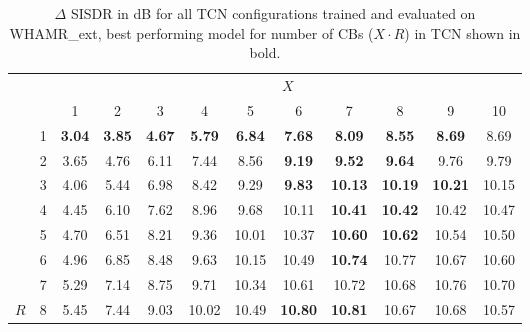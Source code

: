 \documentclass[conference,a4paper]{IEEEtran}
\begin{document}
\begin{table}[!ht]
\setlength\tabcolsep{2.5pt}
\caption{ $\Delta$ \ac{SISDR} 
{in dB}
for all TCN configurations trained and evaluated on WHAMR\_ext, best performing model for number of \acp{CB} ($X\cdot R$) in \ac{TCN} shown in bold.}
\centering
\begin{tabular}{cc|cccccccccc|} 
\cline{3-12}
&  & \multicolumn{10}{c|}{\cellcolor[HTML]{C0C0C0}$X$}\\ 
\cline{3-12} 
 &  & 
 \cellcolor[HTML]{C0C0C0}1 & \cellcolor[HTML]{C0C0C0}2 & \cellcolor[HTML]{C0C0C0}3 & \cellcolor[HTML]{C0C0C0}4 & \cellcolor[HTML]{C0C0C0}5 & \cellcolor[HTML]{C0C0C0}6 & \cellcolor[HTML]{C0C0C0}7 & \cellcolor[HTML]{C0C0C0}8 & \cellcolor[HTML]{C0C0C0}9 & \cellcolor[HTML]{C0C0C0}10 \\ 
 \hline
\multicolumn{1}{|c}{\cellcolor[HTML]{C0C0C0}}& \multicolumn{1}{|c|}{\cellcolor[HTML]{C0C0C0}1} & \bfseries 3.04 & \bfseries 3.85 & \bfseries 4.67 & \bfseries 5.79  & \bfseries 6.84  & \bfseries 7.68  & \bfseries 8.09  & \bfseries 8.55  & \bfseries 8.69  & 8.69  \\
\multicolumn{1}{|c}{\cellcolor[HTML]{C0C0C0}}& \multicolumn{1}{|c|}{\cellcolor[HTML]{C0C0C0}2} & 3.65 & 4.76 & 6.11 & 7.44  & 8.56  & \bfseries 9.19  & \bfseries 9.52  & \bfseries 9.64  & 9.76  & 9.79  \\
\multicolumn{1}{|c}{\cellcolor[HTML]{C0C0C0}}& \multicolumn{1}{|c|}{\cellcolor[HTML]{C0C0C0}3} & 4.06 & 5.44 & 6.98 & 8.42  & 9.29  & \bfseries 9.83  & \bfseries 10.13 & \bfseries 10.19 & \bfseries 10.21 & 10.15 \\
\multicolumn{1}{|c}{\cellcolor[HTML]{C0C0C0}}& \multicolumn{1}{|c|}{\cellcolor[HTML]{C0C0C0}4} & 4.45 & 6.10  & 7.62 & 8.96  & 9.68  & 10.11 & \bfseries 10.41 & \bfseries 10.42 & 10.42 & 10.47 \\
\multicolumn{1}{|c}{\cellcolor[HTML]{C0C0C0}}& \multicolumn{1}{|c|}{\cellcolor[HTML]{C0C0C0}5} & 4.70  & 6.51 & 8.21 & 9.36  & 10.01 & 10.37 & \bfseries 10.60  & \bfseries 10.62 & 10.54 & 10.50  \\
\multicolumn{1}{|c}{\cellcolor[HTML]{C0C0C0}}& \multicolumn{1}{|c|}{\cellcolor[HTML]{C0C0C0}6} & 4.96 & 6.85 & 8.48 & 9.63  & 10.15 & 10.49 & \bfseries 10.74 & 10.77 & 10.67 & 10.60  \\
\multicolumn{1}{|c}{\cellcolor[HTML]{C0C0C0}}& \multicolumn{1}{|c|}{\cellcolor[HTML]{C0C0C0}7} & 5.29 & 7.14 & 8.75 & 9.71  & 10.34 & 10.61 & 10.72 & 10.68 & 10.76 & 10.70  \\
\multicolumn{1}{|c}{\multirow{-8}{*}{\cellcolor[HTML]{C0C0C0}$R$}} & \multicolumn{1}{|c|}{\cellcolor[HTML]{C0C0C0}8} & 5.45 & 7.44 & 9.03 & 10.02 & 10.49 & \bfseries 10.80  & \bfseries 10.81 & 10.67 & 10.68 & 10.57 \\ \hline
\end{tabular}
\label{tab:d_sisdr_results:whamr_ext}
\end{table}
\end{document}
